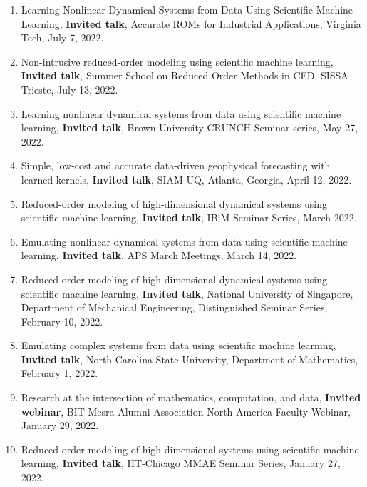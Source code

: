 \documentclass[letterpaper]{article}
\begin{document}
\begin{enumerate}

\item Learning Nonlinear Dynamical Systems from Data Using Scientific Machine Learning, \textbf{Invited talk}, Accurate ROMs for Industrial Applications, Virginia Tech, July 7, 2022.

\item Non-intrusive reduced-order modeling using scientific machine learning, \textbf{Invited talk}, Summer School on Reduced Order Methods in CFD, SISSA Trieste, July 13, 2022.

\item Learning nonlinear dynamical systems from data using scientific machine learning, \textbf{Invited talk}, Brown University CRUNCH Seminar series, May 27, 2022. 

\item Simple, low-cost and accurate data-driven geophysical forecasting with learned kernels, \textbf{Invited talk}, SIAM UQ, Atlanta, Georgia, April 12, 2022.

\item Reduced-order modeling of high-dimensional dynamical systems using scientific machine learning, \textbf{Invited talk}, IBiM Seminar Series, March 2022.

\item Emulating nonlinear dynamical systems from data using scientific machine learning, \textbf{Invited talk}, APS March Meetings, March 14, 2022.

\item Reduced-order modeling of high-dimensional dynamical systems using scientific machine learning, \textbf{Invited talk}, National University of Singapore, Department of Mechanical Engineering, Distinguished Seminar Series, February 10, 2022.

\item Emulating complex systems from data using scientific machine learning, \textbf{Invited talk}, North Carolina State University, Department of Mathematics, February 1, 2022.

\item Research at the intersection of mathematics, computation, and data, \textbf{Invited webinar}, BIT Mesra Alumni Association North America Faculty Webinar, January 29, 2022.

\item Reduced-order modeling of high-dimensional systems using scientific machine learning, \textbf{Invited talk}, IIT-Chicago MMAE Seminar Series, January 27, 2022.


\end{enumerate}
\end{document}

